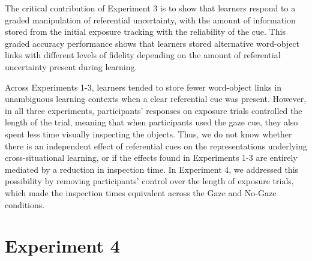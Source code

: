 \documentclass[oneside]{report}
\begin{document}
The critical contribution of Experiment 3 is to show that learners
respond to a graded manipulation of referential uncertainty, with the
amount of information stored from the initial exposure tracking with the
reliability of the cue. This graded accuracy performance shows that
learners stored alternative word-object links with different levels of
fidelity depending on the amount of referential uncertainty present
during learning.

Across Experiments 1-3, learners tended to store fewer word-object links
in unambiguous learning contexts when a clear referential cue was
present. However, in all three experiments, participants' responses on
exposure trials controlled the length of the trial, meaning that when
participants used the gaze cue, they also spent less time visually
inspecting the objects. Thus, we do not know whether there is an
independent effect of referential cues on the representations underlying
cross-situational learning, or if the effects found in Experiments 1-3
are entirely mediated by a reduction in inspection time. In Experiment
4, we addressed this possibility by removing participants' control over
the length of exposure trials, which made the inspection times
equivalent across the Gaze and No-Gaze conditions.

\hypertarget{experiment-4}{%
\section{Experiment 4}\label{experiment-4}}
\end{document}
